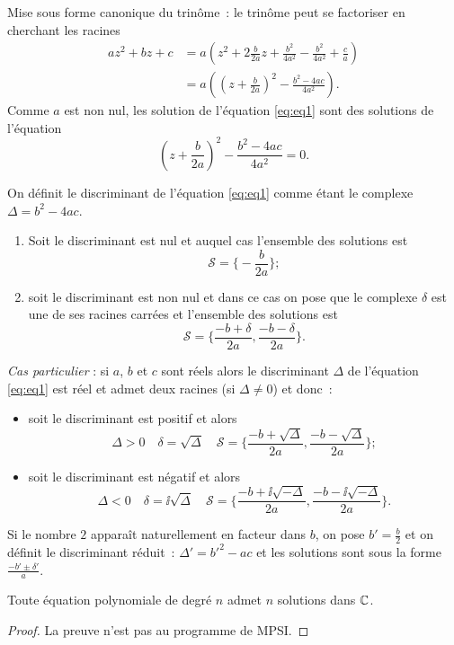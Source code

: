Mise sous forme canonique du trinôme~: le trinôme peut se factoriser en cherchant les racines
\begin{align}
  az^2+bz+c &= a \left(z^2+ 2 \frac{b}{2a}z + \frac{b^2}{4a^2} - \frac{b^2}{4a^2} +\frac{c}{a} \right)\\
  &=a \left( \left(z+\frac{b}{2a} \right)^2 - \frac{b^2-4ac}{4a^2} \right).
\end{align}
Comme \(a\) est non nul, les solution de l'équation \eqref{eq:eq1} sont des solutions de l'équation
\begin{equation}
  \left(z+\frac{b}{2a} \right)^2 - \frac{b^2-4ac}{4a^2} =0.
\end{equation}
%
\begin{defdef}
  On définit le discriminant de l'équation \eqref{eq:eq1} comme étant le complexe \(\Delta=b^2-4ac\).
\end{defdef}
%
\begin{enumerate}
\item Soit le discriminant est nul et auquel cas l'ensemble des solutions est
  \begin{equation}
    \mathcal{S}=\biggl\lbrace-\frac{b}{2a} \biggl\rbrace;
  \end{equation}
\item soit le discriminant est non nul et dans ce cas on pose que le complexe \(\delta\) est une de ses racines carrées et l'ensemble des solutions est
\begin{equation}
  \mathcal{S}=\biggl\lbrace \frac{-b+\delta}{2a} , \frac{-b-\delta}{2a} \biggl\rbrace.
\end{equation}
\end{enumerate}

\emph{Cas particulier} : si \(a\), \(b\) et \(c\) sont réels alors le discriminant \(\Delta\) de l'équation \eqref{eq:eq1} est réel et admet deux racines (si \(\Delta \neq 0\)) et donc~:
\begin{itemize}
\item soit le discriminant est positif et alors
  \begin{equation}
    \Delta >0 \quad \delta=\sqrt{\Delta} \quad \mathcal{S} = \biggl\lbrace \frac{-b+\sqrt{\Delta}}{2a} , \frac{-b-\sqrt{\Delta}}{2a} \biggl\rbrace;
  \end{equation}
\item soit le discriminant est négatif et alors
  \begin{equation}
    \Delta <0 \quad \delta=\ii\sqrt{\Delta} \quad \mathcal{S} = \biggl\lbrace \frac{-b+\ii\sqrt{-\Delta}}{2a} , \frac{-b-\ii\sqrt{-\Delta}}{2a} \biggl\rbrace.
  \end{equation}
\end{itemize}
Si le nombre \(2\) apparaît naturellement en facteur dans \(b\), on pose \(b'=\frac{b}{2}\) et on définit le discriminant réduit~: \(\Delta'=b'^2-ac\) et les solutions sont sous la forme \(\frac{-b'\pm \delta'}{a}\).
%
\begin{theo}
  Toute équation polynomiale de degré \(n\) admet \(n\) solutions dans \(\mathbb{C}\).
\end{theo}
\begin{proof}
  La preuve n'est pas au programme de MPSI.
\end{proof}
%
